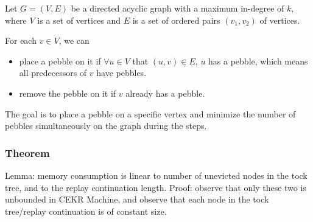 Let $G=(V,E)$ be a directed acyclic graph with a maximum in-degree of $k$, where $V$ is a set of vertices and $E$ is a set of ordered pairs $(v_1, v_2)$ of vertices.

For each $v\in V$, we can
\begin{itemize}
    \item place a pebble on it if $\forall u\in V$ that $(u, v)\in E$, $u$ has a pebble, which means all predecessors of $v$ have pebbles.
    \item remove the pebble on it if $v$ already has a pebble.
\end{itemize}

The goal is to place a pebble on a specific vertex and minimize the number of pebbles simultaneously on the graph during the steps.

\subsubsection{Theorem}
Lemma: memory consumption is linear to number of unevicted nodes in the tock tree, and to the replay continuation length.
Proof: observe that only these two is unbounded in CEKR Machine, and observe that each node in the tock tree/replay continuation is of constant size.